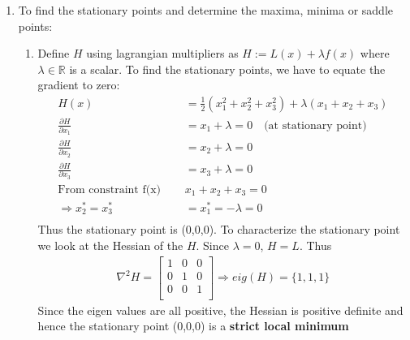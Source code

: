 \begin{enumerate}
 \newpage 
  \item To find the stationary points and determine the maxima, minima or saddle
points:
  \begin{enumerate}
   \item %
   Define $H$  using lagrangian multipliers as $H := L(x) +
\lambda f(x)$ where $\lambda \in \mathbb{R}$ is a scalar. To find the stationary
points, we have to equate the gradient to zero:
   \begin{align*}
    H (x) &= \frac{1}{2} (x_1^2 + x_2^2 + x_3^2) + \lambda (x_1 + x_2 +
x_3) \\
    \frac{\partial H}{\partial x_1} &= x_1 + \lambda  = 0  \quad
\text{(at stationary point)}\\
    \frac{\partial H}{\partial x_2} &= x_2 + \lambda  = 0  \\
    \frac{\partial H}{\partial x_3} &= x_3 + \lambda  = 0  \\
    \text{From constraint  f(x) }\quad  &x_1 + x_2 + x_3 = 0 \\
    \Rightarrow x_2^* = x_3^* &= x_1^* = -\lambda = 0\\
   \end{align*}
   Thus the stationary point is (0,0,0). To characterize the stationary point we
look at the Hessian of the $H$. Since $\lambda = 0$, $H = L$.
Thus 
   \begin{align*}
    \nabla^2 H = \begin{bmatrix}
		  1 & 0 & 0 \\
		  0 & 1 & 0 \\
		  0 & 0 & 1 \\
		  \end{bmatrix}
    \Rightarrow eig(H) = \{1,1,1\}                                     
   \end{align*}
   Since the eigen values are all positive, the Hessian is positive definite and
hence the stationary point (0,0,0) is a \textbf{strict local minimum}
   

\end{enumerate}
\end{enumerate}
